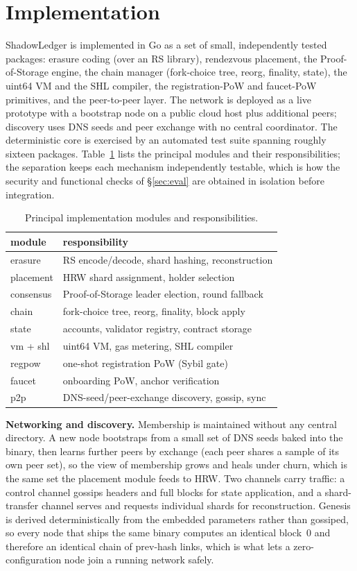 \section{Implementation}
\label{sec:impl}
ShadowLedger is implemented in Go as a set of small, independently tested packages: erasure
coding (over an RS library), rendezvous placement, the Proof-of-Storage engine, the chain
manager (fork-choice tree, reorg, finality, state), the uint64 VM and the SHL compiler, the
registration-PoW and faucet-PoW primitives, and the peer-to-peer layer. The network is deployed
as a live prototype with a bootstrap node on a public cloud host plus additional peers;
discovery uses DNS seeds and peer exchange with no central coordinator. The deterministic core
is exercised by an automated test suite spanning roughly sixteen packages. Table~\ref{tab:modules}
lists the principal modules and their responsibilities; the separation keeps each mechanism
independently testable, which is how the security and functional checks of \S\ref{sec:eval} are
obtained in isolation before integration.

\begin{table}[t]
\centering
\caption{Principal implementation modules and responsibilities.}
\label{tab:modules}
\small
\begin{tabular}{ll}
\toprule
module & responsibility \\
\midrule
erasure      & RS encode/decode, shard hashing, reconstruction \\
placement    & HRW shard assignment, holder selection \\
consensus    & Proof-of-Storage leader election, round fallback \\
chain        & fork-choice tree, reorg, finality, block apply \\
state        & accounts, validator registry, contract storage \\
vm + shl     & uint64 VM, gas metering, SHL compiler \\
regpow       & one-shot registration PoW (Sybil gate) \\
faucet       & onboarding PoW, anchor verification \\
p2p          & DNS-seed/peer-exchange discovery, gossip, sync \\
\bottomrule
\end{tabular}
\end{table}

\textbf{Networking and discovery.} Membership is maintained without any central directory. A new
node bootstraps from a small set of DNS seeds baked into the binary, then learns further peers by
exchange (each peer shares a sample of its own peer set), so the view of membership grows and heals
under churn, which is the same set the placement module feeds to HRW. Two channels carry traffic: a
control channel gossips headers and full blocks for state application, and a shard-transfer channel
serves and requests individual shards for reconstruction. Genesis is derived deterministically from
the embedded parameters rather than gossiped, so every node that ships the same binary computes an
identical block~$0$ and therefore an identical chain of prev-hash links, which is what lets a
zero-configuration node join a running network safely.


